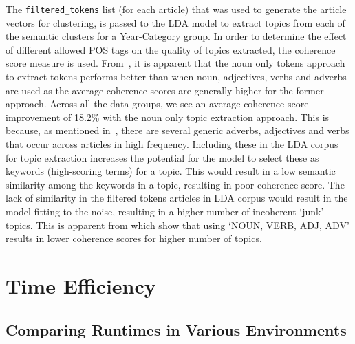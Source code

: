 The \texttt{filtered\_tokens} list (for each article) that was used to generate the article vectors for clustering, is passed to the LDA model to extract topics from each of the semantic clusters for a Year-Category group. In order to determine the effect of different allowed POS tags on the quality of topics extracted, the coherence score measure is used. From~, it is apparent that the noun only tokens approach to extract tokens performs better than when noun, adjectives, verbs and adverbs are used as the average coherence scores are generally higher for the former approach. Across all the data groups, we see an average coherence score improvement of 18.2\% with the noun only topic extraction approach. This is because, as mentioned in~, there are several generic adverbs, adjectives and verbs that occur across articles in high frequency. Including these in the LDA corpus for topic extraction increases the potential for the model to select these as keywords (high-scoring terms) for a topic. This would result in a low semantic similarity among the keywords in a topic, resulting in poor coherence score. The lack of similarity in the filtered tokens articles in LDA corpus would result in the model fitting to the noise, resulting in a higher number of incoherent `junk' topics. This is apparent from  which show that using `NOUN, VERB, ADJ, ADV' results in lower coherence scores for higher number of topics.


\section{Time Efficiency}

\subsection{Comparing Runtimes in Various Environments}
\vspace{-1ex}

